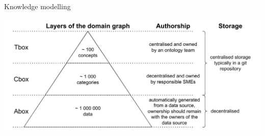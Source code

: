     


\begin{frame}{Knowledge modelling}

        \begin{center}
            \includegraphics[scale=0.5]{images/TboxAboxCboxLayers.pdf} 
        \end{center}

\end{frame}





